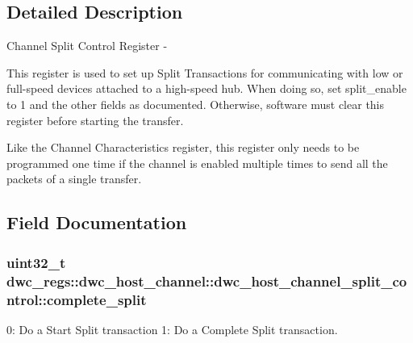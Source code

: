 \subsection{Detailed Description}
Channel Split Control Register -\/

This register is used to set up Split Transactions for communicating with low or full-\/speed devices attached to a high-\/speed hub. When doing so, set split\-\_\-enable to 1 and the other fields as documented. Otherwise, software must clear this register before starting the transfer.

Like the Channel Characteristics register, this register only needs to be programmed one time if the channel is enabled multiple times to send all the packets of a single transfer. 

\subsection{Field Documentation}
\hypertarget{uniondwc__regs_1_1dwc__host__channel_1_1dwc__host__channel__split__control_a5428a632c6c823d28d7623fcafca937b}{
\subsubsection[{complete\-\_\-split}]{\setlength{\rightskip}{0pt plus 5cm}uint32\-\_\-t dwc\-\_\-regs\-::dwc\-\_\-host\-\_\-channel\-::dwc\-\_\-host\-\_\-channel\-\_\-split\-\_\-control\-::complete\-\_\-split}}\label{uniondwc__regs_1_1dwc__host__channel_1_1dwc__host__channel__split__control_a5428a632c6c823d28d7623fcafca937b}
0\-: Do a Start Split transaction 1\-: Do a Complete Split transaction.

